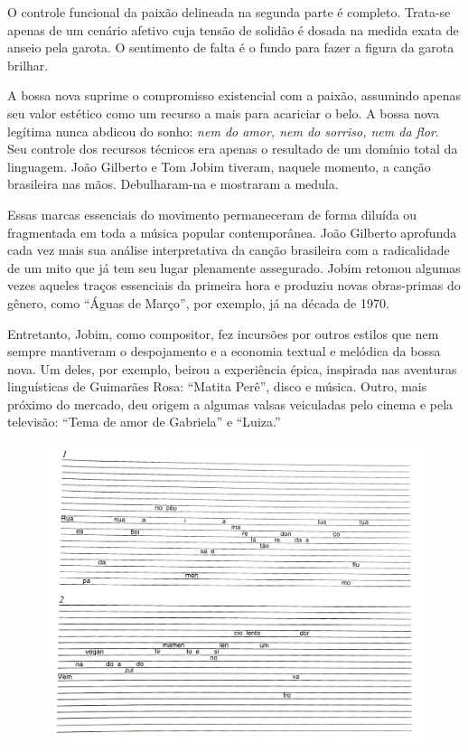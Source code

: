 O controle funcional da paixão delineada na segunda parte é completo.
Trata-se apenas de um cenário afetivo cuja tensão de solidão é dosada na
medida exata de anseio pela garota. O sentimento de falta é o fundo para
fazer a figura da garota brilhar.

A bossa nova suprime o compromisso existencial com a paixão, assumindo
apenas seu valor estético como um recurso a mais para acariciar o belo.
A bossa nova legítima nunca abdicou do sonho: \textit{nem do amor, nem do
sorriso, nem da flor}. Seu controle dos recursos técnicos era apenas o
resultado de um domínio total da linguagem. João Gilberto e Tom Jobim
tiveram, naquele momento, a canção brasileira nas mãos. Debulharam-na e
mostraram a medula.

Essas marcas essenciais do movimento permaneceram de forma diluída ou
fragmentada em toda a música popular contemporânea. João Gilberto
aprofunda cada vez mais sua análise interpretativa da canção brasileira
com a radicalidade de um mito que já tem seu lugar plenamente
assegurado. Jobim retomou algumas vezes aqueles traços essenciais da
primeira hora e produziu novas obras-primas do gênero, como ``Águas de
Março'', por exemplo, já na década de 1970.

Entretanto, Jobim, como compositor, fez incursões por outros estilos que
nem sempre mantiveram o despojamento e a economia textual e melódica da
bossa nova. Um deles, por exemplo, beirou a experiência épica, inspirada
nas aventuras linguísticas de Guimarães Rosa: ``Matita Perê'', disco e
música. Outro, mais próximo do mercado, deu origem a algumas valsas
veiculadas pelo cinema e pela televisão: ``Tema de amor de Gabriela'' e
``Luiza.''

\begin{figure}[H]
\includegraphics[width=\textwidth]{./imgs/figura16.jpg}
\end{figure}

